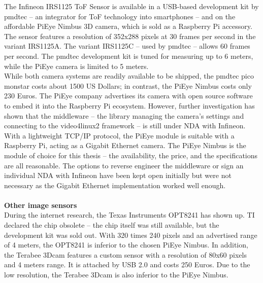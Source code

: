 The Infineon IRS1125 ToF Sensor is available in a USB-based development kit by pmdtec – an integrator for ToF technology into smartphones – and on the affordable PiEye Nimbus 3D camera, which is sold as a Raspberry Pi accessory.  \\
The sensor features a resolution of 352x288 pixels at 30 frames per second in the variant IRS1125A. The variant IRS1125C – used by pmdtec – allows 60 frames per second. The pmdtec development kit is tuned for measuring up to 6 meters, while the PiEye camera is limited to 5 meters.\\
While both camera systems are readily available to be shipped, the pmdtec pico monstar costs about 1500 US Dollars; in contrast, the PiEye Nimbus costs only 230 Euros. The PiEye company advertises its camera with open source software to embed it into the Raspberry Pi ecosystem. However, further investigation has shown that the middleware – the library managing the camera’s settings and connecting to the video4linux2 framework – is still under NDA with Infineon. \\
With a lightweight TCP/IP protocol, the PiEye module is suitable with a Raspberry Pi, acting as a Gigabit Ethernet camera. The PiEye Nimbus is the module of choice for this thesis – the availability, the price, and the specifications are all reasonable. The options to reverse engineer the middleware or sign an individual NDA with Infineon have been kept open initially but were not necessary as the Gigabit Ethernet implementation worked well enough.\\
\\
\textbf{Other image sensors}\\
During the internet research, the Texas Instruments OPT8241 has shown up. TI declared the chip obsolete – the chip itself was still available, but the development kit was sold out. With 320 times 240 pixels and an advertised range of 4 meters, the OPT8241 is inferior to the chosen PiEye Nimbus. In addition, the Terabee 3Dcam features a custom sensor with a resolution of 80x60 pixels and 4 meters range. It is attached by USB 2.0 and costs 250 Euros. Due to the low resolution, the Terabee 3Dcam is also inferior to the PiEye Nimbus. 

